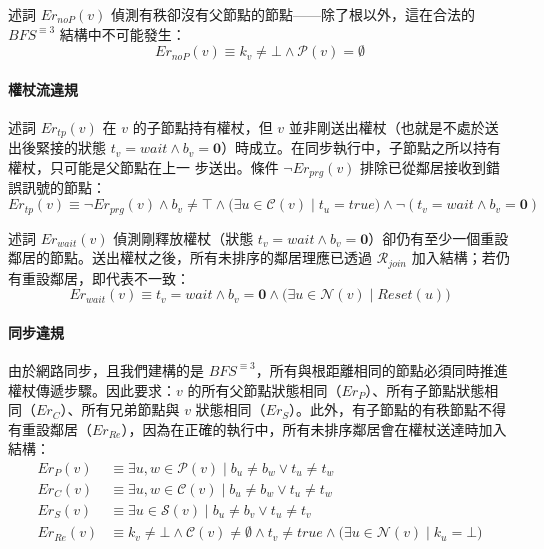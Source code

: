 \documentclass[a4paper, 12pt]{article}
\newcommand{\Neig}{\mathcal{N}}
\newcommand{\Pa}{\mathcal{P}}
\newcommand{\Ch}{\mathcal{C}}
\newcommand{\Si}{\mathcal{S}}
\newcommand{\bz}{\mathbf{0}}
\newcommand{\rk}{k}
\newcommand{\Rjoin}{\mathscr{R}_{join}}
\begin{document}
述詞 \(Er_{noP}(v)\) 偵測有秩卻沒有父節點的節點——除了根以外，這在合法的 \(BFS^{\equiv 3}\) 結構中不可能發生：
\begin{equation}
    Er_{noP}(v) \equiv \rk_v \neq \bot \wedge \Pa(v) = \emptyset
\end{equation}

\paragraph*{權杖流違規}

述詞 \(Er_{tp}(v)\) 在 \(v\) 的子節點持有權杖，但 \(v\) 並非剛送出權杖（也就是不處於送出後緊接的狀態 \(t_v=\mathit{wait}\wedge b_v=\bz\)）時成立。在同步執行中，子節點之所以持有權杖，只可能是父節點在上一 步送出。條件 \(\neg Er_{prg}(v)\) 排除已從鄰居接收到錯誤訊號的節點：
\begin{equation}
    Er_{tp}(v) \equiv \neg Er_{prg}(v) \wedge b_v \neq \top
    \wedge \bigl(\exists u \in \Ch(v) \mid t_u = \mathit{true}\bigr)
    \wedge \neg(t_v = \mathit{wait} \wedge b_v = \bz)
    \label{eq:zhErtp}
\end{equation}

述詞 \(Er_{wait}(v)\) 偵測剛釋放權杖（狀態 \(t_v=\mathit{wait}\wedge b_v=\bz\)）卻仍有至少一個重設鄰居的節點。送出權杖之後，所有未排序的鄰居理應已透過 \(\Rjoin\) 加入結構；若仍有重設鄰居，即代表不一致：
\begin{equation}
    Er_{wait}(v) \equiv t_v = \mathit{wait} \wedge b_v = \bz
    \wedge \bigl(\exists u \in \Neig(v) \mid \mathit{Reset}(u)\bigr)
    \label{eq:zhErwait}
\end{equation}

\paragraph*{同步違規}

由於網路同步，且我們建構的是 \(BFS^{\equiv 3}\)，所有與根距離相同的節點必須同時推進權杖傳遞步驟。因此要求：\(v\) 的所有父節點狀態相同（\(Er_P\)）、所有子節點狀態相同（\(Er_C\)）、所有兄弟節點與 \(v\) 狀態相同（\(Er_S\)）。此外，有子節點的有秩節點不得有重設鄰居（\(Er_{Re}\)），因為在正確的執行中，所有未排序鄰居會在權杖送達時加入結構：
\begin{align}
    Er_P(v) &\equiv \exists u, w \in \Pa(v) \mid b_u \neq b_w \vee t_u \neq t_w
    \label{eq:zhErP}\\
    Er_C(v) &\equiv \exists u, w \in \Ch(v) \mid b_u \neq b_w \vee t_u \neq t_w
    \label{eq:zhErC}\\
    Er_S(v) &\equiv \exists u \in \Si(v) \mid b_u \neq b_v \vee t_u \neq t_v
    \label{eq:zhErS}\\
    Er_{Re}(v) &\equiv \rk_v \neq \bot \wedge \Ch(v) \neq \emptyset
    \wedge t_v \neq \mathit{true}
    \wedge \bigl(\exists u \in \Neig(v) \mid \rk_u = \bot\bigr)
    \label{eq:zhRtnd}
\end{align}
\end{document}
